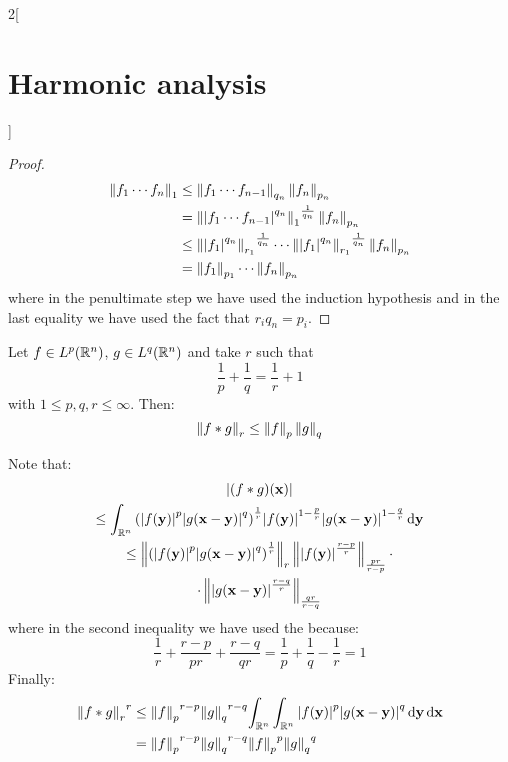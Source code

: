 \documentclass[../../../main_math.tex]{subfiles}
\begin{document}
\begin{multicols}{2}[\section{Harmonic analysis}]
\begin{proof}
    \begin{align*}
      \left\|{f_1\cdots f_n}\right\|_1 & \leq \left\|{f_1\cdots f_{n-1}}\right\|_{q_n}\left\|f_n\right\|_{p_n}                                                                    \\
                               & = {\left\|\abs{f_1\cdots f_{n-1}}^{q_n}\right\|_{1}}^{\frac{1}{q_n}}\left\|f_n\right\|_{p_n}                                             \\
                               & \leq {\left\|\abs{f_1}^{q_n}\right\|_{r_1}}^{\frac{1}{q_n}}\cdots {\left\|\abs{f_1}^{q_n}\right\|_{r_1}}^{\frac{1}{q_n}}\left\|f_n\right\|_{p_n} \\
                               & =\left\|f_1\right\|_{p_1}\cdots\left\|f_n\right\|_{p_n}
    \end{align*}
    where in the penultimate step we have used the induction hypothesis and in the last equality we have used the fact that $r_iq_n=p_i$.
  \end{proof}
  \begin{lemma}\label{HA:youngConvolution}
    Let $f\in L^p(\mathbb{R}^n)$, $g\in L^q(\mathbb{R}^n)$ and take $r$ such that $$\frac{1}{p}+\frac{1}{q}=\frac{1}{r}+1$$ with $1\leq p,q,r\leq \infty$. Then: $$\left\|f*g\right\|_r\leq\left\|f\right\|_p\left\|g\right\|_q$$
  \end{lemma}
  \begin{sproof}
    Note that:
    \begin{multline*}
      \abs{(f*g)(\boldsymbol{\mathrm{x}})} \\
      \leq\int_{\mathbb{R}^n}{\left(\abs{f(\boldsymbol{\mathrm{y}})}^{p}\abs{g(\boldsymbol{\mathrm{x}}-\boldsymbol{\mathrm{y}})}^{q}\right)}^\frac{1}{r}\abs{f(\boldsymbol{\mathrm{y}})}^{1-\frac{p}{r}}\abs{g(\boldsymbol{\mathrm{x}}-\boldsymbol{\mathrm{y}})}^{1-\frac{q}{r}}\dd{\boldsymbol{\mathrm{y}}}    \\
      \leq \left\|{\left(\abs{f(\boldsymbol{\mathrm{y}})}^{p}\abs{g(\boldsymbol{\mathrm{x}}-\boldsymbol{\mathrm{y}})}^{q}\right)}^\frac{1}{r}\right\|_r\left\|\abs{f(\boldsymbol{\mathrm{y}})}^{\frac{r-p}{r}}\right\|_{\frac{pr}{r-p}}\cdot\\\cdot\left\|\abs{g(\boldsymbol{\mathrm{x}}-\boldsymbol{\mathrm{y}})}^{\frac{r-q}{r}}\right\|_{\frac{qr}{r-q}}
    \end{multline*}
    where in the second inequality we have used the  because:
    $$\frac{1}{r}+\frac{r-p}{pr}+\frac{r-q}{qr}=\frac{1}{p}+\frac{1}{q}-\frac{1}{r}=1$$
    Finally:
    \begin{align*}
      {\norm{f*g}_r}^r & \leq {\norm{f}_p}^{r-p}{\norm{g}_q}^{r-q} \!\int_{\RR^n}\int_{\RR^n}\abs{f(\vf{y})}^{p}\abs{g(\vf{x}-\vf{y})}^{q}\dd{\vf{y}}\dd{\vf{x}} \\
                       & ={\norm{f}_p}^{r-p}{\norm{g}_q}^{r-q} {\norm{f}_p}^{p}{\norm{g}_q}^{q}                                                                  \\

\end{align*}
\end{sproof}
\end{multicols}
\end{document}
